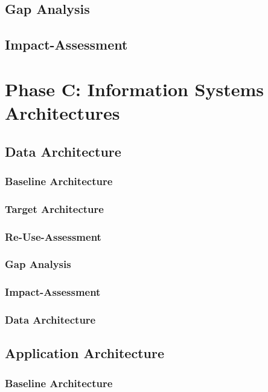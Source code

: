 \subsection{Gap Analysis}

\subsection{Impact-Assessment}

\section{Phase C: Information Systems Architectures}

\subsection{Data Architecture}
\subsubsection{Baseline Architecture}

\subsubsection{Target Architecture}

\subsubsection{Re-Use-Assessment}

\subsubsection{Gap Analysis}

\subsubsection{Impact-Assessment}

\subsubsection{Data Architecture}

\subsection{Application Architecture}

\subsubsection{Baseline Architecture}

